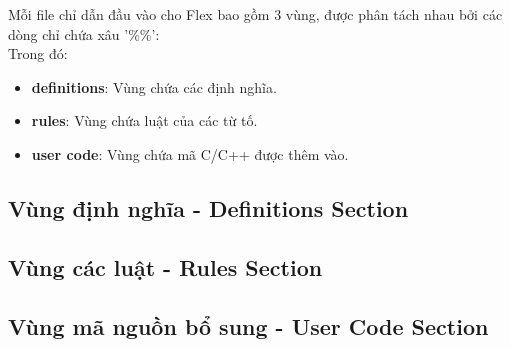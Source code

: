 \documentclass[../report.tex]{subfiles}
\begin{document}
Mỗi file chỉ dẫn đầu vào cho Flex bao gồm 3 vùng, được phân tách nhau 
bởi các dòng chỉ chứa xâu '\%\%': \\


\noindent Trong đó: 
\begin{itemize}
\item \textbf{definitions}: Vùng chứa các định nghĩa. 
\item \textbf{rules}: Vùng chứa luật của các từ tố. 
\item \textbf{user code}: Vùng chứa mã C/C++ được thêm vào.
\end{itemize}

\subsection{Vùng định nghĩa - Definitions Section}
\subsection{Vùng các luật - Rules Section}
\subsection{Vùng mã nguồn bổ sung - User Code Section}
\end{document}
